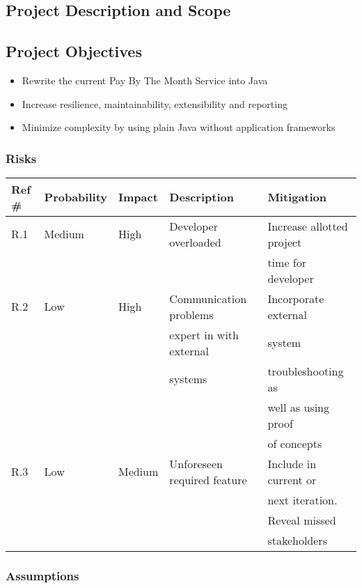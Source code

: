 \subsection{Project Description and Scope}

\subsection{Project Objectives}
\label{Project Objectives}
\begin{itemize}
\item Rewrite the current Pay By The Month Service into Java
\item Increase resilience, maintainability, extensibility and reporting
\item Minimize complexity by using plain Java without application frameworks
\end{itemize}

\subsubsection{Risks}

\begin{tabular}{|l|l|l|l|l|}
\hline
{\bf Ref \#} & {\bf Probability} & {\bf Impact} & {\bf Description} & {\bf Mitigation} \\
\hline
R.1 & Medium & High & Developer overloaded & Increase allotted project \\ & & & & time for developer \\
\hline
R.2 & Low & High & Communication problems & Incorporate external  \\  & & & expert in with external & system \\  & & & systems & troubleshooting as \\ & & & & well as using  proof \\ & & & &  of concepts \\ 
\hline
R.3 & Low & Medium & Unforeseen required feature & Include in current or \\ & & & &  next iteration. \\ & & & & Reveal missed \\ & & & & stakeholders \\
\hline
\end{tabular}

\subsubsection{Assumptions}

